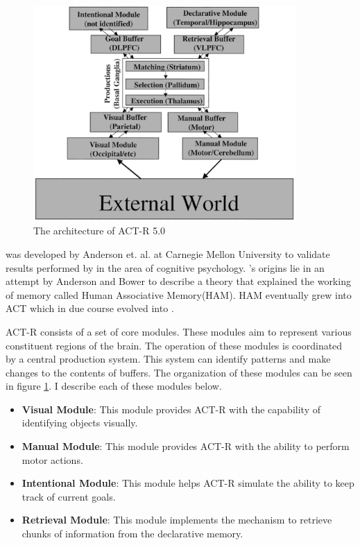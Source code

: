 \begin{figure}[htp]
  \centering
  \includegraphics[width=100mm]{ACTRArch.eps}
  \caption{The architecture of ACT-R 5.0\cite{anderson_jr-etal:2004a}}
  \label{ACTR_ARCH}
\end{figure}



\actr was developed by Anderson et. al. \cite{anderson_jr-etal:2004a}
at Carnegie Mellon University to validate results performed by in the
area of cognitive psychology. \actr's origins lie in an attempt by
Anderson and Bower to describe a theory that explained the working of
memory called Human Associative Memory(HAM)\cite{AndersonBower73}. HAM
eventually grew into {\small ACT}\cite{Anderson76} which in due course evolved
into \actr\cite{Anderson83}.

ACT-R consists of a set of core modules. These modules aim to
represent various constituent regions of the brain. The operation of
these modules is coordinated by a central production system. This
system can identify patterns and make changes to the contents of
buffers. The organization of these modules can be seen in figure
\ref{ACTR_ARCH}. I describe each of these modules below.

\begin{itemize}
\item {\bf Visual Module}: This module provides ACT-R with the capability of
  identifying objects visually.
\item {\bf Manual Module}: This module provides ACT-R with the ability to
  perform motor actions.
\item {\bf Intentional Module}: This module helps ACT-R simulate the
  ability to keep track of current goals.
\item {\bf Retrieval Module}: This module implements the mechanism to
  retrieve chunks of information from the declarative memory.
\end{itemize}

